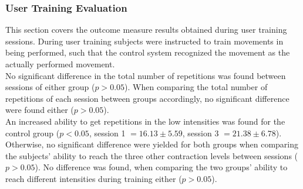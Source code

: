 \begin{multicols}{2}



\subsubsection*{User Training Evaluation} \label{sec:R:userTraining}

This section covers the outcome measure results obtained during user training sessions. During user training subjects were instructed to train movements in being performed, such that the control system recognized the movement as the actually performed movement. \\%
No significant difference in the total number of repetitions was found between sessions of either group ($p > 0.05$). When comparing the total number of repetitions of each session between groups accordingly, no significant difference were found either ($p > 0.05$). \\ %
An increased ability to get repetitions in the low intensities was found for the control group ($p < 0.05$, session 1 $ = 16.13 \pm 5.59$, session 3 $= 21.38 \pm 6.78$). Otherwise, no significant difference were yielded for both groups when comparing the subjects' ability to reach the three other contraction levels between sessions ($p > 0.05$).
No difference was found, when comparing the two groups' ability to reach different intensities during training either ($p > 0.05$). \\

\end{multicols}
